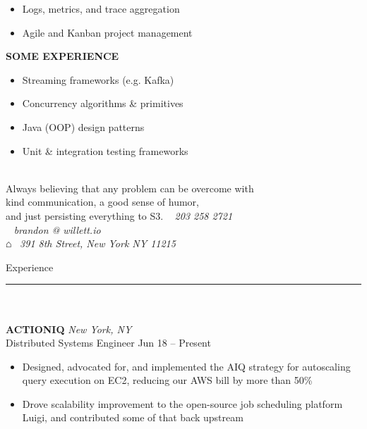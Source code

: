 \documentclass[letterpaper]{article}
\begin{document}
\begin{bgbox}[height=\paperheight, colback=gray!15, width=0.38\textwidth, left=0.12in, right=0.11in]
\begin{itemize} [noitemsep,topsep=4pt]
			\item Logs, metrics, and trace aggregation
			\item Agile and Kanban project management
		\end{itemize}
		\vspace*{12pt}
		\textbf{SOME EXPERIENCE}
		\begin{itemize} [noitemsep,topsep=4pt]
			\item Streaming frameworks (e.g. Kafka)
			\item Concurrency algorithms \& primitives
			\item Java (OOP) design patterns
			\item Unit \& integration testing frameworks
		\end{itemize}
	\end{bgbox}%
	\begin{bgbox}[height=\paperheight, colback=white, width=0.62\textwidth]
		\vspace*{9pt}
		\begin{bgbox}[height=1.60in, colback=gray!15, width=\textwidth, top=0.05in]
			\\
			Always believing that any problem can be overcome with \\
			kind communication, a good sense of humor, \\
			and just persisting everything to S3. \hfill {\large\Telefon}~ \textit{203 258 2721} \\
			\null \hfill {\large\Letter}~ \textit{brandon @ willett.io } \\
			\null \hfill $\house$~ \textit{391 8th Street, New York NY 11215}
		\end{bgbox}\vspace*{25.5pt}
		{\Huge{Experience}}\\[-6pt]
		\noindent\rule{\textwidth}{1pt}\\ \\
		\textbf{ACTIONIQ} \hfill \textit{New York, NY}\\
		Distributed Systems Engineer \hfill Jun 18 -- Present
		\begin{itemize} [noitemsep,topsep=4pt]
			\item Designed, advocated for, and implemented the AIQ strategy for autoscaling query execution on EC2, reducing our AWS bill by more than 50\%
			\item Drove scalability improvement to the open-source job scheduling platform Luigi, and contributed some of that back upstream

\end{itemize}
\end{bgbox}
\end{document}
